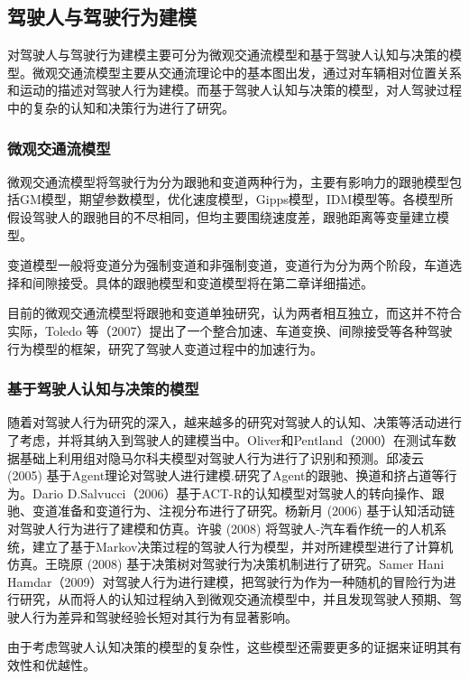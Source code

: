 \subsection{驾驶人与驾驶行为建模}
对驾驶人与驾驶行为建模主要可分为微观交通流模型和基于驾驶人认知与决策的模型。微观交通流模型主要从交通流理论中的基本图出发，通过对车辆相对位置关系和运动的描述对驾驶人行为建模。而基于驾驶人认知与决策的模型，对人驾驶过程中的复杂的认知和决策行为进行了研究。
\subsubsection{微观交通流模型}
微观交通流模型将驾驶行为分为跟驰和变道两种行为，主要有影响力的跟驰模型包括GM模型，期望参数模型，优化速度模型，Gipps模型，IDM模型等。各模型所假设驾驶人的跟驰目的不尽相同，但均主要围绕速度差，跟驰距离等变量建立模型。

变道模型一般将变道分为强制变道和非强制变道，变道行为分为两个阶段，车道选择和间隙接受。具体的跟驰模型和变道模型将在第二章详细描述。

目前的微观交通流模型将跟驰和变道单独研究，认为两者相互独立，而这并不符合实际，Toledo 等（2007）提出了一个整合加速、车道变换、间隙接受等各种驾驶行为模型的框架，研究了驾驶人变道过程中的加速行为\cite{Toledo2007}。


\subsubsection{基于驾驶人认知与决策的模型}
随着对驾驶人行为研究的深入，越来越多的研究对驾驶人的认知、决策等活动进行了考虑，并将其纳入到驾驶人的建模当中。Oliver和Pentland（2000）在测试车数据基础上利用组对隐马尔科夫模型对驾驶人行为进行了识别和预测\cite{Oliver2000}。邱凌云 (2005) 基于Agent理论对驾驶人进行建模.研究了Agent的跟驰、换道和挤占道等行为\cite{邱凌云2005}。Dario D.Salvucci（2006）基于ACT-R的认知模型对驾驶人的转向操作、跟驰、变道准备和变道行为、注视分布进行了研究\cite{Salvucci2006}。杨新月 (2006) 基于认知活动链对驾驶人行为进行了建模和仿真\cite{杨新月2006}。许骏 (2008) 将驾驶人-汽车看作统一的人机系统，建立了基于Markov决策过程的驾驶人行为模型，并对所建模型进行了计算机仿真\cite{许骏2008}。王晓原 (2008) 基于决策树对驾驶行为决策机制进行了研究\cite{王晓原2008}。Samer Hani Hamdar（2009）对驾驶人行为进行建模，把驾驶行为作为一种随机的冒险行为进行研究，从而将人的认知过程纳入到微观交通流模型中，并且发现驾驶人预期、驾驶人行为差异和驾驶经验长短对其行为有显著影响\cite{Hamdar2009a}。

由于考虑驾驶人认知决策的模型的复杂性，这些模型还需要更多的证据来证明其有效性和优越性。


